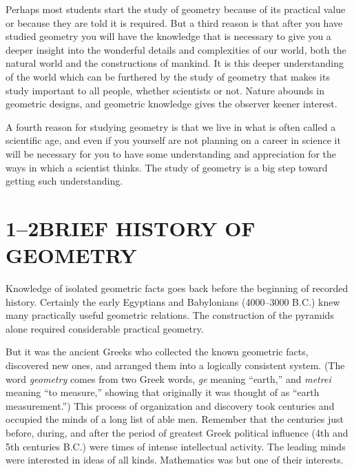 \documentclass[11pt]{book}
\theoremstyle{bkplain}
\theoremstyle{XIplainnote}
\theoremstyle{bkplain}
\theoremstyle{bkplain}
\begin{document}
Perhaps most students start the study of geometry because of its practical value
or because they are told it is required. But a third reason is that after you
have studied geometry you will have the knowledge that is necessary to give you a
deeper insight into the wonderful details and complexities of our world, both the
natural world and the constructions of mankind. It is this deeper understanding
of the world which can be furthered by the study of geometry that makes its study
important to all people, whether scientists or not. Nature abounds in geometric
designs, and geometric knowledge gives the observer keener interest.

A fourth reason for studying geometry is that we live in what is often called a
scientific age, and even if you yourself are not planning on a career in science
it will be necessary for you to have some understanding and appreciation for the
ways in which a scientist thinks. The study of geometry is a big step toward
getting such understanding.

\section*{1--2\quad BRIEF HISTORY OF GEOMETRY}

\setcounter{footnote}{0}
Knowledge of isolated geometric facts goes back before the beginning of recorded
history. Certainly the early Egyptians and Babylonians (4000--3000 B.C.) knew
many practically useful geometric relations. The construction of the pyramids
alone required considerable practical geometry.

But it was the ancient Greeks who collected the known geometric facts, discovered
new ones, and arranged them into a logically consistent system. (The word
\emph{geometry} comes from two Greek words, \emph{ge} meaning ``earth,'' and
\emph{metrei} meaning ``to measure,'' showing that originally it was thought of
as ``earth measurement.'') This process of organization and discovery took
centuries and occupied the minds of a long list of able men. Remember that the
centuries just before, during, and after the period of greatest Greek political
influence (4th and 5th centuries B.C.) were times of intense intellectual
activity. The leading minds were interested in ideas of all kinds. Mathematics
was but one of their interests.
\end{document}
